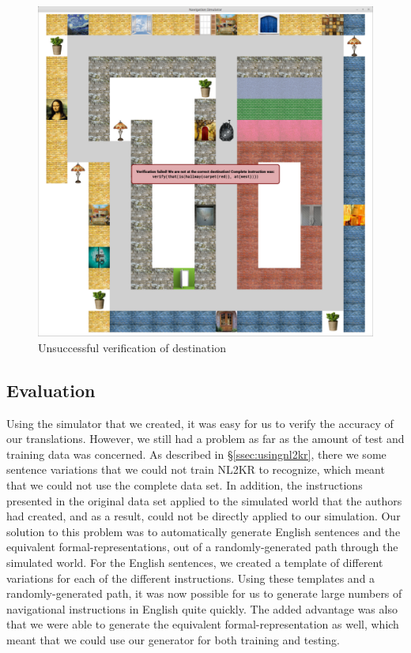 \documentclass[11pt,letterpaper]{article}
\begin{document}
\begin{figure}[ht!]
\includegraphics[scale=0.15]{verifyfail.pdf}
\caption{Unsuccessful verification of destination}\label{fig:verifyfail}
\end{figure}

\subsection{Evaluation}

Using the simulator that we created, it was easy for us to verify the accuracy of our translations. However, we still had a problem as far as the amount of test and training data was concerned. As described in \S\ref{ssec:usingnl2kr}, there we some sentence variations that we could not train NL2KR to recognize, which meant that we could not use the complete data set. In addition, the instructions presented in the original data set applied to the simulated world that the authors had created, and as a result, could not be directly applied to our simulation. Our solution to this problem was to automatically generate English sentences and the equivalent formal-representations, out of a randomly-generated path through the simulated world. For the English sentences, we created a template of different variations for each of the different instructions. Using these templates and a randomly-generated path, it was now possible for us to generate large numbers of navigational instructions in English quite quickly. The added advantage was also that we were able to generate the equivalent formal-representation as well, which meant that we could use our generator for both training and testing.
\end{document}
